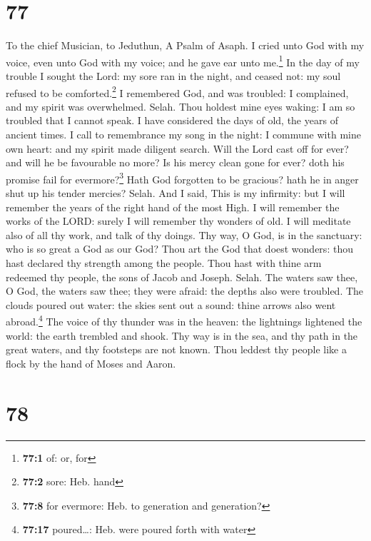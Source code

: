\hypertarget{section-76}{%
\section{77}\label{section-76}}

To the chief Musician, to Jeduthun, A Psalm of Asaph.  I
cried unto God with my voice, even unto God with my voice; and he gave
ear unto me.\footnote{\textbf{77:1} of: or, for}  In the
day of my trouble I sought the Lord: my sore ran in the night, and
ceased not: my soul refused to be comforted.\footnote{\textbf{77:2}
  sore: Heb. hand}  I remembered God, and was troubled: I
complained, and my spirit was overwhelmed. Selah.  Thou
holdest mine eyes waking: I am so troubled that I cannot speak.
 I have considered the days of old, the years of ancient
times.  I call to remembrance my song in the night: I
commune with mine own heart: and my spirit made diligent search.
 Will the Lord cast off for ever? and will he be
favourable no more?  Is his mercy clean gone for ever?
doth his promise fail for evermore?\footnote{\textbf{77:8} for evermore:
  Heb. to generation and generation?}  Hath God forgotten
to be gracious? hath he in anger shut up his tender mercies? Selah.
 And I said, This is my infirmity: but I will remember
the years of the right hand of the most High.  I will
remember the works of the LORD: surely I will remember thy wonders of
old.  I will meditate also of all thy work, and talk of
thy doings.  Thy way, O God, is in the sanctuary: who is
so great a God as our God?  Thou art the God that doest
wonders: thou hast declared thy strength among the people.
 Thou hast with thine arm redeemed thy people, the sons
of Jacob and Joseph. Selah.  The waters saw thee, O God,
the waters saw thee; they were afraid: the depths also were troubled.
 The clouds poured out water: the skies sent out a sound:
thine arrows also went abroad.\footnote{\textbf{77:17} poured\ldots:
  Heb. were poured forth with water}  The voice of thy
thunder was in the heaven: the lightnings lightened the world: the earth
trembled and shook.  Thy way is in the sea, and thy path
in the great waters, and thy footsteps are not known. 
Thou leddest thy people like a flock by the hand of Moses and Aaron.

\hypertarget{section-77}{%
\section{78}\label{section-77}}

